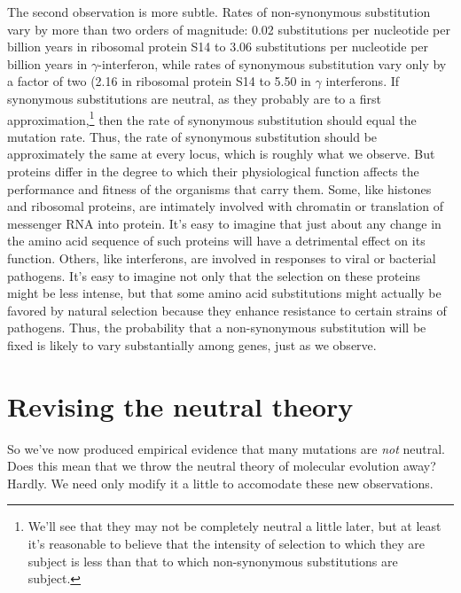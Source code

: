 \documentclass[12pt]{article}
\begin{document}
The second observation is more subtle. Rates of non-synonymous
substitution vary by more than two orders of magnitude: 0.02
substitutions per nucleotide per billion years in ribosomal protein
S14 to 3.06 substitutions per nucleotide per billion years in
$\gamma$-interferon, while rates of synonymous substitution vary only
by a factor of two (2.16 in ribosomal protein S14 to 5.50 in $\gamma$
interferons. If synonymous substitutions are neutral, as they probably are to
a first approximation,\footnote{We'll see that they may not be
  completely neutral a little later, but at least it's reasonable to
  believe that the intensity of selection to which they are subject is
  less than that to which non-synonymous substitutions are subject.}
then the rate of synonymous substitution should equal the mutation
rate. Thus, the rate of synonymous substitution should be
approximately the same at every locus, which is roughly what we
observe. But proteins differ in the degree to which their
physiological function affects the performance and fitness of the
organisms that carry them. Some, like histones and ribosomal proteins,
are intimately involved with chromatin or translation of messenger RNA
into protein. It's easy to imagine that just about any change in the
amino acid sequence of such proteins will have a detrimental effect on
its function. Others, like interferons, are involved in responses to
viral or bacterial pathogens. It's easy to imagine not only that the
selection on these proteins might be less intense, but that some amino
acid substitutions might actually be favored by natural selection
because they enhance resistance to certain strains of pathogens. Thus,
the probability that a non-synonymous substitution will be fixed is
likely to vary substantially among genes, just as we observe.

\section*{Revising the neutral theory}

So we've now produced empirical evidence that many mutations are {\it
  not\/} neutral. Does this mean that we throw the neutral theory of
molecular evolution away? Hardly. We need only modify it a little to
accomodate these new observations.
\end{document}
